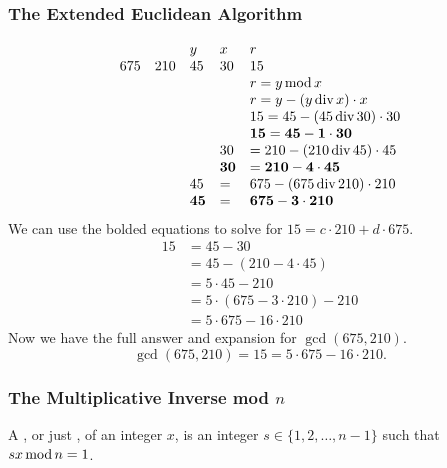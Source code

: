 \subsubsection*{The Extended Euclidean Algorithm}
\[
    \begin{array}{lllll}
            &     & y           & x           & r                                \\
        675 & 210 & 45          & 30          & 15                               \\
            &     &             &             & r = y \operatorname{\text{mod}} x                    \\
            &     &             &             & r = y - (y \operatorname{\text{div}} x) \cdot x      \\
            &     &             &             & 15 = 45 - (45 \operatorname{\text{div}} 30) \cdot 30 \\
            &     &             &             & \mathbf{15 = 45 - 1 \cdot 30}    \\
            &     &             & 30          & = 210 - (210 \operatorname{\text{div}} 45) \cdot 45  \\
            &     &             & \mathbf{30} & \mathbf{= 210 - 4 \cdot 45}      \\
            &     & 45          & =           & 675 - (675 \operatorname{\text{div}} 210) \cdot 210  \\
            &     & \mathbf{45} & \mathbf{=}  & \mathbf{675 - 3 \cdot 210}
    \end{array}
\]
We can use the bolded equations to solve for $15 = c \cdot 210 + d \cdot 675$.
\begin{align*}
    15 & = 45 - 30                           \\
       & = 45 - (210 - 4 \cdot 45)           \\
       & = 5 \cdot 45 - 210                  \\
       & = 5 \cdot (675 - 3 \cdot 210) - 210 \\
       & = 5 \cdot 675 - 16 \cdot 210
\end{align*}
Now we have the full answer and expansion for $\gcd(675,210)$.
\[
    \gcd(675,210) = 15 = 5 \cdot 675 - 16 \cdot 210.
\]

\subsubsection*{The Multiplicative Inverse mod $n$}
A , or just , of an integer $x$, is an integer $s \in \{1,2,\ldots,n-1\}$ such that $sx \operatorname{\text{mod}} n = 1$.

